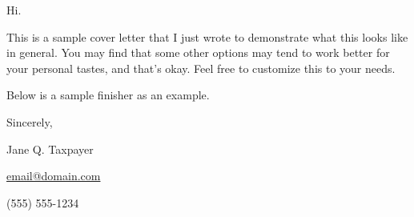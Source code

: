 \documentclass[class=article, crop=false]{standalone}
\begin{document}
Hi.

This is a sample cover letter that I just wrote to demonstrate what this looks like in general.
You may find that some other options may tend to work better for your personal tastes, and that's
okay. Feel free to customize this to your needs.

Below is a sample finisher as an example.



\vspace{5mm}

Sincerely, 

Jane Q. Taxpayer

\href{mailto:email@domain.com}{email@domain.com}

(555) 555-1234
\end{document}
